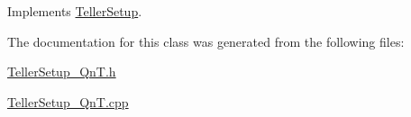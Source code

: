 Implements \hyperlink{class_teller_setup_a2050cd6f277e76cd662b68cf33396034}{Teller\+Setup}.



The documentation for this class was generated from the following files\+:\begin{DoxyCompactItemize}
\item 
\hyperlink{_teller_setup__1_qn_t_8h}{Teller\+Setup\+\_\+Qn\+T.\+h}\item 
\hyperlink{_teller_setup__1_qn_t_8cpp}{Teller\+Setup\+\_\+Qn\+T.\+cpp}\end{DoxyCompactItemize}
